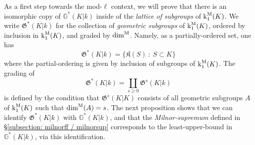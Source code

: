 \documentclass[11pt]{amsart}
\theoremstyle{definition}
\theoremstyle{remark}
\numberwithin{equation}{section}
\newcommand{\G}{\mathbb{G}}
\newcommand{\Gbb}{\mathbb{G}}
\newcommand{\Kfrak}{\mathfrak{K}}
\newcommand{\Gfrak}{\mathfrak{G}}
\renewcommand{\k}{\operatorname{k}^{\rm M}}
\newcommand{\dimm}{\dim^{\rm M}}
\begin{document}
As a first step towards the mod-$\ell$ context, we will prove that there is an isomorphic copy of $\Gbb^*(K|k)$ inside of the \emph{lattice of subgroups} of $\k_1(K)$.
We write $\Gfrak^*(K|k)$ for the collection of \emph{geometric subgroups} of $\k_1(K)$, ordered by inclusion in $\k_1(K)$, and graded by $\dimm$.
Namely, as a partially-ordered set, one has
\[ \Gfrak^*(K|k) = \{\Kfrak(S) \ : \ S \subset K \}\]
where the partial-ordering is given by inclusion of subgroups of $\k_1(K)$.
The grading of 
\[ \Gfrak^*(K|k) = \coprod_{s \geq 0} \Gfrak^s(K|k) \]
is defined by the condition that $\Gfrak^s(K|K)$ consists of all geometric subgroups $A$ of $\k_1(K)$ such that $\dimm(A) = s$.
The next proposition shows that we can identify $\Gfrak^*(K|k)$ with $\G^*(K|k)$, and that the \emph{Milnor-supremum} defined in \S\ref{subsection: milnorff / milnorsup} corresponds to the least-upper-bound in $\G^*(K|k)$, via this identification.
\end{document}
